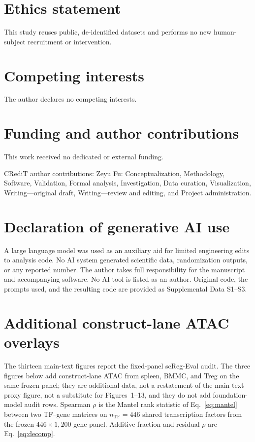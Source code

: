 \documentclass[fleqn,10pt,lineno]{wlpeerj}
\begin{document}
\section*{Ethics statement}
This study reuses public, de-identified datasets and performs no new human-subject recruitment or
intervention.

\section*{Competing interests}
The author declares no competing interests.

\section*{Funding and author contributions}
This work received no dedicated or external funding.

CRediT author contributions: Zeyu Fu: Conceptualization, Methodology, Software, Validation,
Formal analysis, Investigation, Data curation, Visualization, Writing---original draft, Writing---review
and editing, and Project administration.

\section*{Declaration of generative AI use}
A large language model was used as an auxiliary aid for limited engineering
edits to analysis code. No AI system generated scientific data, randomization
outputs, or any reported number. The author takes full responsibility for the
manuscript and accompanying software. No AI tool is listed as an author.
Original code, the prompts used, and the resulting code are provided as
Supplemental Data S1--S3.

\FloatBarrier
\appendix
\setcounter{figure}{0}
\renewcommand{\thefigure}{A\arabic{figure}}
\section{Additional construct-lane ATAC overlays}

The thirteen main-text figures report the fixed-panel scReg-Eval audit. The three figures below add
construct-lane ATAC from spleen, BMMC, and Treg on the same frozen panel; they are additional data,
not a restatement of the main-text proxy figure, not a substitute for Figures~1--13, and they do not
add foundation-model audit rows. Spearman $\rho$ is the Mantel rank statistic of Eq.~\eqref{eq:mantel} between two TF--gene
matrices on $n_{\mathrm{TF}}=446$ shared transcription factors from the frozen $446\times 1{,}200$
gene panel. Additive fraction and residual $\rho$ are Eq.~\eqref{eq:decomp}.
\end{document}
